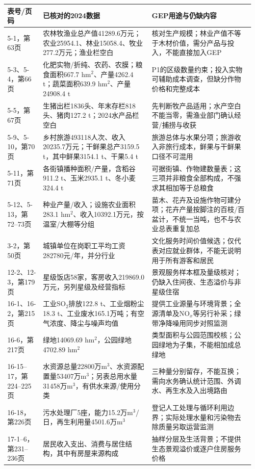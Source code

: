\documentclass[12pt,a4paper,fontset=fandol]{ctexart}
\begin{document}
{\small
\begin{longtable}{P{2.4cm}P{5.3cm}P{5.3cm}}
\toprule 表号/页码 & 已核对的2024数据 & GEP用途与仍缺内容 \\\midrule{}-1，第63页 & 农林牧渔业总产值41289.6万元；农业25954.1、林业15058.4、牧业277.2万元；渔业栏空白 & 核对生产规模；林业产值不等于木材价值，需分产品与投入，不能直接加入GEP \\
5-3、5-4，第66页 & 化肥实物/折纯、农药、农膜；粮食面积667.7 hm$^2$、产量4262.4 t；蔬菜面积639.9 hm$^2$、产量24908.4 t & P1的区级数量约束；投入实物可辅助成本调查，但缺分作物价格和完整成本 \\
5-5，第67页 & 生猪出栏1836头、年末存栏818头、猪肉127.2 t；2024水产品栏空白 & 先判断牧产品适用；水产空白不能当零，需渔业部门确认经营/捕捞与收获 \\
5-9、5-10，第70页 & 乡村旅游493118人次、收入20235.7万元；干鲜果总产3159.5 t，其中鲜果3154.1 t、干果5.4 t & 旅游总体与水果分项；旅游收入非旅行成本，鲜果与干鲜果口径不可混用 \\
5-11，第71页 & 各街镇播种面积/产量，含稻谷911.2 t、玉米2935.1 t、冬小麦324.4 t & 可据街镇、作物建数量表；这三项并非粮食全部构成，不强求其相加等于总粮食 \\
5-12、5-13，第72--73页 & 种业产量/收入；设施农业面积283.1 hm$^2$、收入10392.1万元，按温室/大棚等分组 & 苗木、花卉及设施作物可建分项；花卉产量按脚注的百枝/百盆计，不统一当吨，也不与农业总表重复加总 \\
3-2，第50页 & 城镇单位在岗职工平均工资282780元/年，并分行业 & 文化服务时间价值候选；仅代表对应就业群体，不能无说明用于所有游客和居民 \\
12-2、12-3，第179页 & 星级饭店58家，客房收入219869.0万元，另列星级及经营指标 & 景观服务样本框及量级核对；仍缺入住间夜、生态溢价与非星级住宿 \\
16-1、16-2，第215页 & 工业SO$_2$排放122.8 t、工业烟粉尘18.3 t、工业废水165.1万吨；有空气浓度、降尘与噪声均值 & 提供工业源量与环境背景；全源清单及NO$_x$等另行补采；绿带净降噪用同步对照监测 \\
16-6，第217页 & 绿地14069.69 hm$^2$，公园绿地4702.89 hm$^2$ & 类型面积与公园范围校核；公园绿地为子集，不能相加成总绿地 \\
16-15--17，第224--225页 & 水资源总量22800万m$^3$、水资源配置量53407万m$^3$；另表总用水量31458万m$^3$，有供水来源/使用分类 & 三种量分别留存，不能互换；需向水务确认统计范围、外调水、再生水及入出境路由 \\
16-18，第226页 & 污水处理厂5座，能力15.2万m$^3$/日，再生利用量4501.6万m$^3$ & 登记人工处理与循环利用边界；实际处理水量和污染物去除质量另取运营监测 \\
17-1--6，第231--236页 & 居民收入支出、消费与居住结构，其中有房屋来源构成 & 抽样分层及生活背景；不提供生态景观溢价或逐户住房服务价格 \\
\bottomrule
\end{longtable}}
\end{document}
